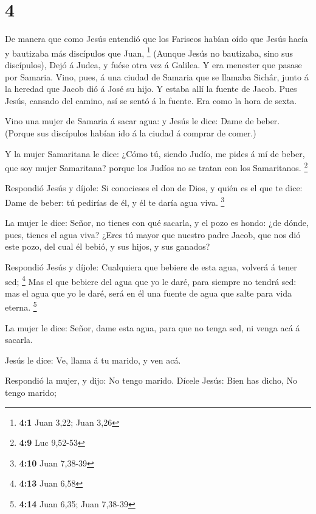\hypertarget{section-3}{%
\section{4}\label{section-3}}

 De manera que como Jesús entendió que los Fariseos habían
oído que Jesús hacía y bautizaba más discípulos que Juan, \footnote{\textbf{4:1}
  Juan 3,22; Juan 3,26}  (Aunque Jesús no bautizaba, sino
sus discípulos),  Dejó á Judea, y fuése otra vez á
Galilea.  Y era menester que pasase por Samaria.
 Vino, pues, á una ciudad de Samaria que se llamaba
Sichâr, junto á la heredad que Jacob dió á José su hijo. 
Y estaba allí la fuente de Jacob. Pues Jesús, cansado del camino, así se
sentó á la fuente. Era como la hora de sexta.

 Vino una mujer de Samaria á sacar agua: y Jesús le dice:
Dame de beber.  (Porque sus discípulos habían ido á la
ciudad á comprar de comer.)

 Y la mujer Samaritana le dice: ¿Cómo tú, siendo Judío, me
pides á mí de beber, que soy mujer Samaritana? porque los Judíos no se
tratan con los Samaritanos. \footnote{\textbf{4:9} Luc 9,52-53}

 Respondió Jesús y díjole: Si conocieses el don de Dios,
y quién es el que te dice: Dame de beber: tú pedirías de él, y él te
daría agua viva. \footnote{\textbf{4:10} Juan 7,38-39}

 La mujer le dice: Señor, no tienes con qué sacarla, y el
pozo es hondo: ¿de dónde, pues, tienes el agua viva? 
¿Eres tú mayor que nuestro padre Jacob, que nos dió este pozo, del cual
él bebió, y sus hijos, y sus ganados?

 Respondió Jesús y díjole: Cualquiera que bebiere de esta
agua, volverá á tener sed; \footnote{\textbf{4:13} Juan 6,58}
 Mas el que bebiere del agua que yo le daré, para siempre
no tendrá sed: mas el agua que yo le daré, será en él una fuente de agua
que salte para vida eterna. \footnote{\textbf{4:14} Juan 6,35; Juan
  7,38-39}

 La mujer le dice: Señor, dame esta agua, para que no
tenga sed, ni venga acá á sacarla.

 Jesús le dice: Ve, llama á tu marido, y ven acá.

 Respondió la mujer, y dijo: No tengo marido. Dícele
Jesús: Bien has dicho, No tengo marido;

